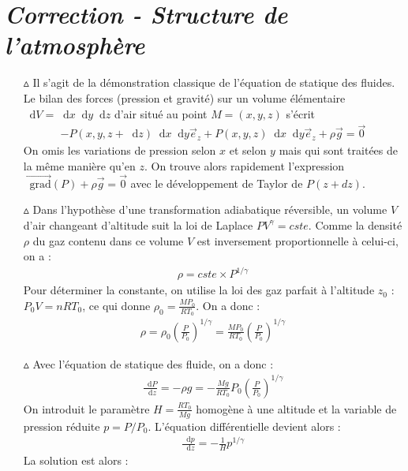\documentclass{report}
\newcommand*\dif{\mathop{}\!\mathrm{d}}
\newcommand*\grad{\mathop{}\!\mathrm{grad}}
\begin{document}
\newpage

\section*{\textit{Correction - Structure de l'atmosphère}}

\begin{itemize}

	\item[$\vartriangle$] Il s'agit de la démonstration classique de l'équation de statique des fluides. Le bilan des forces (pression et gravité) sur un volume élémentaire $\dif V=\dif x \dif y \dif z$ d'air situé au point $M=(x,y,z)$ s'écrit
	\begin{align*}
		-P(x,y,z+ \dif z)\dif x\dif y\vec{e}_z+P(x,y,z)\dif x\dif y\vec{e}_z+\rho\vec{g}=\vec{0}
	\end{align*}
	On omis les variations de pression selon $x$ et selon $y$ mais qui sont traitées de la même manière qu'en $z$. On trouve alors rapidement l'expression $\vec{\grad}(P) + \rho\vec{g}=\vec{0}$ avec le développement de Taylor de $P(z+dz)$.
	
	\item[$\vartriangle$] Dans l'hypothèse d'une transformation adiabatique réversible, un volume $V$ d'air changeant d'altitude suit la loi de Laplace $PV^\gamma=cste$. Comme la densité $\rho$ du gaz contenu dans ce volume $V$ est inversement proportionnelle à celui-ci, on a :
	\begin{align*}
		\rho = cste\times P^{1/\gamma}
	\end{align*}
	Pour déterminer la constante, on utilise la loi des gaz parfait à l'altitude $z_0$ : $P_0V=nRT_0$, ce qui donne $\rho_0=\frac{MP_0}{RT_0}$. On a donc :
	\begin{align*}
		\rho = \rho_0\left(\frac{P}{P_0} \right) ^{1/\gamma}=\frac{MP_0}{RT_0}\left(\frac{P}{P_0} \right) ^{1/\gamma}
	\end{align*}
	
	\item[$\vartriangle$] Avec l'équation de statique des fluide, on a donc :
	\begin{align*}
		\frac{\dif P}{\dif z}=-\rho g = -\frac{Mg}{RT_0}P_0\left(\frac{P}{P_0} \right) ^{1/\gamma}
	\end{align*}
	On introduit le paramètre $H=\frac{RT_0}{Mg}$ homogène à une altitude et la variable de pression réduite $p=P/P_0$. L'équation différentielle devient alors :
	\begin{align*}
		\frac{\dif p}{\dif z}=-\frac{1}{H}p^{1/\gamma}
	\end{align*}	
	La solution est alors :
	

\end{itemize}
\end{document}
